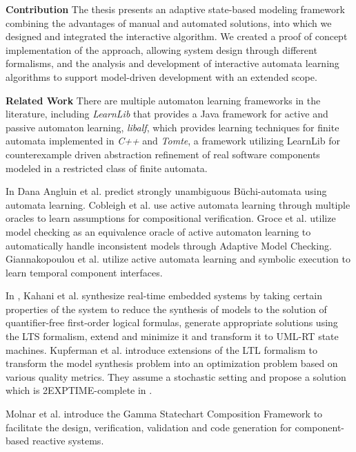 \textbf{Contribution} The thesis presents an adaptive state-based modeling framework combining the advantages of manual and automated solutions, into which we designed and integrated the interactive algorithm. We created a proof of concept implementation of the approach, allowing system design through different formalisms, and the analysis and development of interactive automata learning algorithms to support model-driven development with an extended scope.
\clearpage

\textbf{Related Work} There are multiple automaton learning frameworks in the literature, including
\emph{LearnLib}\cite{10.1007/978-3-319-21690-4_32} that provides a Java framework for active and passive automaton learning, \emph{libalf}, which provides learning techniques for finite automata implemented in \emph{C++} and \emph{Tomte}\cite{aarts2012automata}, a framework utilizing LearnLib for counterexample driven abstraction refinement of real software components modeled in a restricted class of finite automata.

In \cite{angluin2020strongly} Dana Angluin et al. predict strongly unambiguous Büchi-automata using automata learning. Cobleigh et al. use active automata learning through multiple oracles to learn assumptions for compositional verification\cite{cobleigh2003learning}. 
Groce et al. utilize model checking as an equivalence oracle of active automaton learning to automatically handle inconsistent models through Adaptive Model Checking\cite{groce2002adaptive}. Giannakopoulou et al. utilize active automata learning and symbolic execution to learn temporal component interfaces\cite{giannakopoulou2012symbolic}.

In \cite{kahaninafiseh}, Kahani et al. synthesize real-time embedded systems by taking certain properties of the system to reduce the synthesis of models to the solution of quantifier-free first-order logical formulas, generate appropriate solutions using the LTS formalism, extend and minimize it and transform it to UML-RT state machines.
Kupferman et al. introduce extensions of the LTL formalism to transform the model synthesis problem into an optimization problem based on various quality metrics. They assume a stochastic setting and propose a solution which is 2EXPTIME-complete in \cite{kupferman}.

Molnar et al. introduce the Gamma Statechart Composition Framework to facilitate the design, verification, validation and code generation for component-based reactive systems\cite{DBLP:conf/icse/MolnarGVMV18}.



